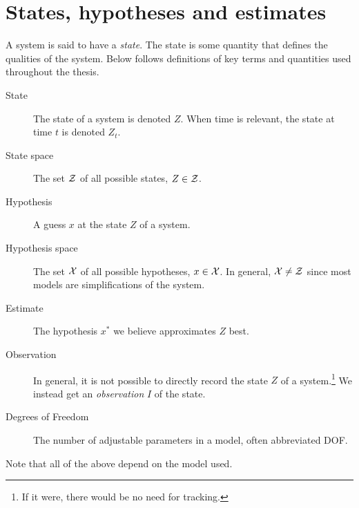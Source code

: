 \section{States, hypotheses and estimates}
A system is said to have a \emph{state}. The state is some quantity
that defines the qualities of the system. Below follows definitions of
key terms and quantities used throughout the thesis.

\begin{description}
\item[State] The state of a system is denoted $Z$. When time is
  relevant, the state at time $t$ is denoted $Z_t$.
\item[State space] The set $\mathcal{Z}$ of all possible states, $Z \in \mathcal{Z}$.
\item[Hypothesis] A guess $x$ at the state $Z$ of a system.
\item[Hypothesis space] The set $\mathcal{X}$ of all possible hypotheses, $x
  \in \mathcal{X}$. In general, $\mathcal{X} \neq \mathcal{Z}$ since most models are
  simplifications of the system.
\item[Estimate] The hypothesis $x^*$ we believe approximates $Z$ best.
\item[Observation] In general, it is not possible to directly record
  the state $Z$ of a system.\footnote{If it were, there would be no
    need for tracking.} We instead get an \emph{observation} $I$ of
  the state.
\item[Degrees of Freedom] The number of adjustable parameters in a
  model, often abbreviated DOF.
\end{description}
Note that all of the above depend on the  model used.
